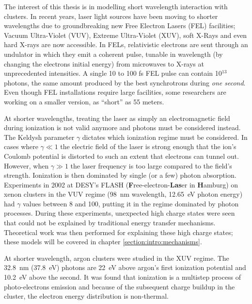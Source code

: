 The interest of this thesis is in modelling short wavelength interaction with
clusters. In recent years, laser light sources have been moving to shorter
wavelengths due to groundbreaking new Free Electron Lasers (FEL)
facilities; Vacuum Ultra-Violet (VUV), Extreme Ultra-Violet (XUV), soft X-Rays
and even hard X-rays are now accessible. In FELs, relativistic electrons are sent
through an undulator in which they emit a coherent pulse, tunable in wavelength
(by changing the electrons initial energy)
from microwaves to X-rays\cite{Brabec2009,Ackermann2007a,Pellegrini2012} at
unprecedented intensities. A single 10 to 100 fs FEL pulse can contain 10$^{13}$
photons, the same amount produced by the best synchrotrons during
\textit{one second}\cite{Bostedt2009}. Even though FEL installations require
large facilities, some researchers are working on a smaller version, as
``short'' as 55 meters\cite{Shintake2008}.

At shorter wavelengths, treating the laser as simply an electromagnetic field
during ionization is not valid anymore and photons must be considered instead.
The Keldysh parameter $\gamma$ dictates which ionization regime must be considered. In
cases where $\gamma \ll 1$ the electric field of the laser is strong enough that
the ion's Coulomb potential is distorted to such an extent
that electrons can tunnel out.
However, when $\gamma \gg 1$ the laser frequency is too large compared to the
field's strength. Ionization is then dominated by single (or a few) photon
absorption.
Experiments in
2002\cite{Wabnitz2002,Bostedt2009} at
DESY's FLASH (\textbf{F}ree-electron-\textbf{Las}er in \textbf{H}amburg)
on xenon clusters in the VUV regime (98~nm wavelength, 12.65~eV photon energy)
had $\gamma$ values between 8 and
100, putting it in the regime dominated by photon processes.
During these experiments, unexpected high charge states were seen that could not
be explained by traditional energy transfer mechanisms. Theoretical work was
then performed for explaining these high charge states; these models will be
covered in chapter \ref{section:intro:mechanisms}.



At shorter wavelength,
argon clusters were studied in the XUV regime\cite{Bostedt2008}. The 32.8~nm
(37.8~eV) photons are 22~eV above argon's first ionization
potential and 10.2~eV  above the second. It was found that ionization is a multistep process of
photo-electrons emission and because of the subsequent charge buildup in the
cluster, the electron energy distribution is non-thermal.

